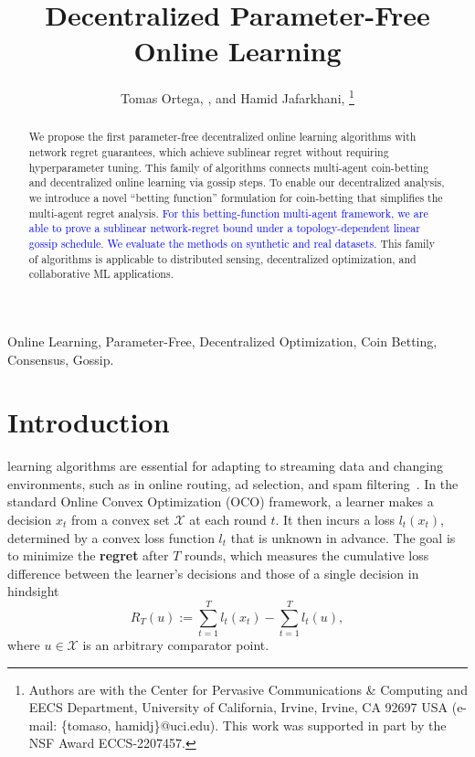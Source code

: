 \documentclass[journal]{IEEEtran}
\title{Decentralized Parameter-Free Online Learning}
\author{Tomas Ortega, \IEEEmembership{Graduate Student Member, IEEE}, and Hamid Jafarkhani, \IEEEmembership{Fellow, IEEE}
    \thanks{
        Authors are with the Center for Pervasive Communications \& Computing and  EECS Department, University of California, Irvine, Irvine, CA 92697 USA (e-mail: \{tomaso, hamidj\}@uci.edu).
This work was supported in part by the NSF Award ECCS-2207457.
}
}
\begin{document}
\maketitle

\begin{abstract}
    We propose the first parameter-free decentralized online learning algorithms with network regret guarantees, which achieve sublinear regret without requiring hyperparameter tuning.
    This family of algorithms connects multi-agent coin-betting and decentralized online learning via gossip steps.
    To enable our decentralized analysis, we introduce a novel ``betting function'' formulation for coin-betting that simplifies the multi-agent regret analysis.
    \textcolor{blue}{For this betting-function multi-agent framework, we are able to prove a sublinear network-regret bound under a topology-dependent linear gossip schedule.}
    \textcolor{blue}{We evaluate the methods on synthetic and real datasets.}
    This family of algorithms is applicable to distributed sensing, decentralized optimization, and collaborative ML applications.
\end{abstract}
\begin{IEEEkeywords}
    Online Learning, Parameter-Free, Decentralized Optimization, Coin Betting, Consensus, Gossip.
\end{IEEEkeywords}

\section{Introduction}
 learning algorithms are essential for adapting to streaming data and changing environments, such as in online routing, ad selection, and spam filtering~\cite{hazan_introduction_2023,shalev-shwartz_online_2011}.
In the standard Online Convex Optimization (OCO) framework, a learner makes a decision $x_{t}$ from a convex set $\mathcal{X}$ at each round $t$.
It then incurs a loss $l_{t}(x_{t})$, determined by a convex loss function $l_t$ that is unknown in advance.
The goal is to minimize the \textbf{regret} after $T$ rounds, which measures the cumulative loss difference between the learner's decisions and those of a single decision in hindsight
\begin{equation}
    R_{T}(u) := \sum_{t=1}^{T} l_{t}(x_t) - \sum_{t=1}^{T} l_{t}(u),
\end{equation}
where $u \in \mathcal{X}$ is an arbitrary comparator point.
\end{document}
